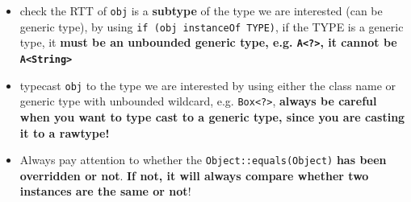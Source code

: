 \documentclass[10pt, landscape]{article}
\begin{document}
\begin{multicols}{4}
\begin{enumerate}
\begin{itemize}
        \item check the RTT of \texttt{obj} is a \textbf{subtype} of the type we are interested (can be generic type), by using \texttt{if (obj instanceOf TYPE)}, if the TYPE is a generic type, it \textbf{must be an unbounded generic type, e.g. \texttt{A<?>}, it cannot be \texttt{A<String>}}
        \item typecast \texttt{obj} to the type we are interested by using either the class name or generic type with unbounded wildcard, e.g. \texttt{Box<?>}, \textbf{always be careful when you want to type cast to a generic type, since you are casting it to a rawtype!}
        \item Always pay attention to whether the \texttt{Object::equals(Object)} \textbf{has been overridden or not}. \textbf{If not, it will always compare whether two instances are the same or not}!
    \end{itemize}
\end{enumerate}


\end{multicols}
\end{document}
